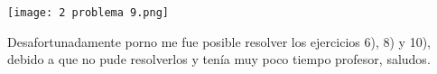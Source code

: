 \documentclass[12pt]{article}
\begin{document}
\begin{center}
\texttt{[image: 2 problema 9.png]}
\end{center}\vspace{0.1cm}
\newpage

Desafortunadamente porno me fue posible resolver los ejercicios 6), 8) y 10), debido a que no pude resolverlos y tenía muy poco tiempo profesor, saludos. 
\end{document}
